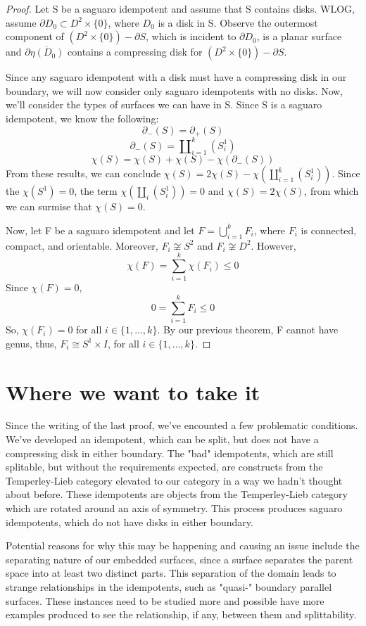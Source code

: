 \documentclass[11pt]{article}
\newcommand{\TL}{Temperley-Lieb }
\begin{document}
\begin{proof}
Let S be a saguaro idempotent and assume that S contains disks. WLOG, assume $\partial D_0\subset D^2\times\{ 0 \}$, where $D_0$ is a disk in S. Observe the outermost component of $(D^2\times\{ 0 \})-\partial S$, which is incident to $\partial D_0$, is a planar surface and $\partial\overline{\eta(D_0)}$ contains a compressing disk for $(D^2\times\{ 0 \})-\partial S$.

Since any saguaro idempotent with a disk must have a compressing disk in our boundary, we will now consider only saguaro idempotents with no disks. Now, we'll consider the types of surfaces we can have in S. Since S is a saguaro idempotent, we know the following:
\[\partial_-(S)=\partial_+(S)\]
\[\partial_-(S) = \amalg_{i=1}^k(S^1_i)\]
\[\chi(S) = \chi(S)+\chi(S)-\chi(\partial_-(S))\]
From these results, we can conclude $\chi(S) = 2\chi(S)-\chi(\amalg_{i=1}^k(S^1_i))$. Since the $\chi(S^1) = 0$, the term $\chi(\amalg_i(S^1_i)) = 0$ and $\chi(S) = 2\chi(S)$, from which we can surmise that $\chi(S) = 0$. 

Now, let F be a saguaro idempotent and let $F = \bigcup\limits_{i=1}^kF_i$, where $F_i$ is connected, compact, and orientable. Moreover, $F_i\not\cong S^2$ and $F_i\not\cong D^2$. However, 
\[\chi(F) = \sum\limits_{i=1}^k\chi(F_i)\leq 0\]
Since $\chi(F) = 0$,
\[0 = \sum\limits_{i=1}^kF_i\leq0\]
So, $\chi(F_i) = 0$ for all $i\in\{ 1,\hdots,k \}$. By our previous theorem, F cannot have genus, thus, $F_i\cong S^1\times I$, for all $i\in\{ 1,\hdots,k \}$.
\end{proof} 

\section*{Where we want to take it}
Since the writing of the last proof, we've encounted a few problematic conditions. We've developed an idempotent, which can be split, but does not have a compressing disk in either boundary. The "bad" idempotents, which are still splitable, but without the requirements expected, are constructs from the \TL category elevated to our category in a way we hadn't thought about before. These idempotents are objects from the \TL category which are rotated around an axis of symmetry. This process produces saguaro idempotents, which do not have disks in either boundary. 

Potential reasons for why this may be happening and causing an issue include the separating nature of our embedded surfaces, since a surface separates the parent space into at least two distinct parts. This separation of the domain leads to strange relationships in the idempotents, such as "quasi-" boundary parallel surfaces. These instances need to be studied more and possible have more examples produced to see the relationship, if any, between them and splittability. 
\end{document}
